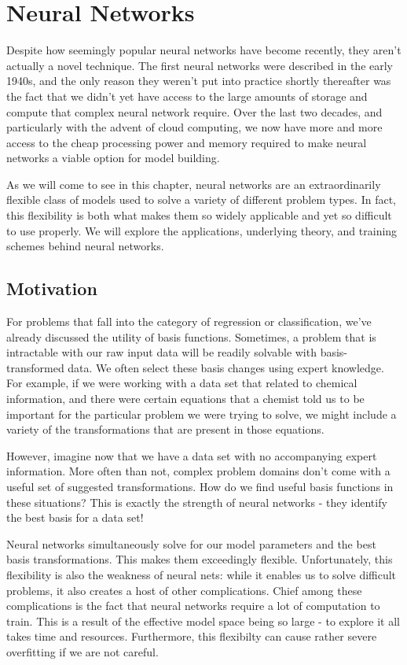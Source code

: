 \chapter{Neural Networks}
Despite how seemingly popular neural networks have become recently, they aren't actually a novel technique. The first neural networks were described in the early 1940s, and the only reason they weren't put into practice shortly thereafter was the fact that we didn't yet have access to the large amounts of storage and compute that complex neural network require. Over the last two decades, and particularly with the advent of cloud computing, we now have more and more access to the cheap processing power and memory required to make neural networks a viable option for model building.

As we will come to see in this chapter, neural networks are an extraordinarily flexible class of models used to solve a variety of different problem types. In fact, this flexibility is both what makes them so widely applicable and yet so difficult to use properly. We will explore the applications, underlying theory, and training schemes behind neural networks.

\section{Motivation}
For problems that fall into the category of regression or classification, we've already discussed the utility of basis functions. Sometimes, a problem that is intractable with our raw input data will be readily solvable with basis-transformed data. We often select these basis changes using expert knowledge. For example, if we were working with a data set that related to chemical information, and there were certain equations that a chemist told us to be important for the particular problem we were trying to solve, we might include a variety of the transformations that are present in those equations.

However, imagine now that we have a data set with no accompanying expert information. More often than not, complex problem domains don't come with a useful set of suggested transformations. How do we find useful basis functions in these situations? This is exactly the strength of neural networks - they identify the best basis for a data set!

Neural networks simultaneously solve for our model parameters and the best basis transformations. This makes them exceedingly flexible. Unfortunately, this flexibility is also the weakness of neural nets: while it enables us to solve difficult problems, it also creates a host of other complications. Chief among these complications is the fact that neural networks require a lot of computation to train. This is a result of the effective model space being so large - to explore it all takes time and resources. Furthermore, this flexibilty can cause rather severe overfitting if we are not careful.

